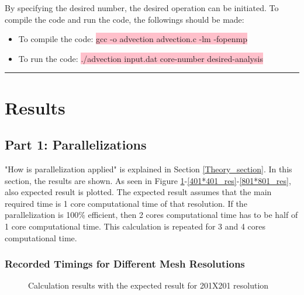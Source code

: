 \documentclass{article}
\begin{document}
By specifying the desired number, the desired operation can be initiated. To compile the code and run the code, the followings should be made: 
\begin{itemize}
\color{black}
\item To compile the code: \colorbox{pink}{gcc -o advection advection.c -lm -fopenmp}
\item To run the code: \colorbox{pink}{./advection input.dat core-number desired-analysis}
\end{itemize}

\noindent
{\color{black} \rule{\linewidth}{0.5mm}}

\clearpage
\section{Results}
\label{results_section}
\subsection{Part 1: Parallelizations}
"How is parallelization applied" is explained in Section \ref{Theory_section}. In this section, the results are shown. As seen in Figure \ref{201*201_res}-\ref{401*401_res}-\ref{801*801_res}, also expected result is plotted. The expected result assumes that the main required time is 1 core computational time of that resolution. If the parallelization is 100\% efficient, then 2 cores computational time has to be half of 1 core computational time. This calculation is repeated for 3 and 4 cores computational time. 
\subsubsection{Recorded Timings for Different Mesh Resolutions}


\begin{figure}[hbt!]
  \centering
{}
  \caption{Calculation results with the expected result for 201X201 resolution}
  \label{201*201_res}
\end{figure}
\end{document}
